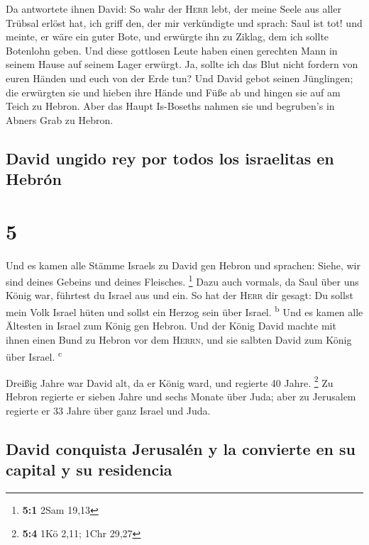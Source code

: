  Da antwortete ihnen David: So wahr der \textsc{Herr}
lebt, der meine Seele aus aller Trübsal erlöst hat,  ich
griff den, der mir verkündigte und sprach: Saul ist tot! und meinte, er
wäre ein guter Bote, und erwürgte ihn zu Ziklag, dem ich sollte
Botenlohn geben.  Und diese gottlosen Leute haben einen
gerechten Mann in seinem Hause auf seinem Lager erwürgt. Ja, sollte ich
das Blut nicht fordern von euren Händen und euch von der Erde tun?
 Und David gebot seinen Jünglingen; die erwürgten sie und
hieben ihre Hände und Füße ab und hingen sie auf am Teich zu Hebron.
Aber das Haupt Is-Boseths nahmen sie und begruben's in Abners Grab zu
Hebron.

\hypertarget{david-ungido-rey-por-todos-los-israelitas-en-hebruxf3n}{%
\subsection{David ungido rey por todos los israelitas en
Hebrón}\label{david-ungido-rey-por-todos-los-israelitas-en-hebruxf3n}}

\hypertarget{section-4}{%
\section{5}\label{section-4}}

 Und es kamen alle Stämme Israels zu David gen Hebron und
sprachen: Siehe, wir sind deines Gebeins und deines Fleisches.
\footnote{\textbf{5:1} 2Sam 19,13}  Dazu auch vormals, da
Saul über uns König war, führtest du Israel aus und ein. So hat der
\textsc{Herr} dir gesagt: Du sollst mein Volk Israel hüten und sollst
ein Herzog sein über Israel. \textsuperscript{b}  Und es
kamen alle Ältesten in Israel zum König gen Hebron. Und der König David
machte mit ihnen einen Bund zu Hebron vor dem \textsc{Herrn}, und sie
salbten David zum König über Israel. \textsuperscript{c}

 Dreißig Jahre war David alt, da er König ward, und
regierte 40 Jahre. \footnote{\textbf{5:4} 1Kö 2,11; 1Chr 29,27}
 Zu Hebron regierte er sieben Jahre und sechs Monate über
Juda; aber zu Jerusalem regierte er 33 Jahre über ganz Israel und Juda.

\hypertarget{david-conquista-jerusaluxe9n-y-la-convierte-en-su-capital-y-su-residencia}{%
\subsection{David conquista Jerusalén y la convierte en su capital y su
residencia}\label{david-conquista-jerusaluxe9n-y-la-convierte-en-su-capital-y-su-residencia}}

